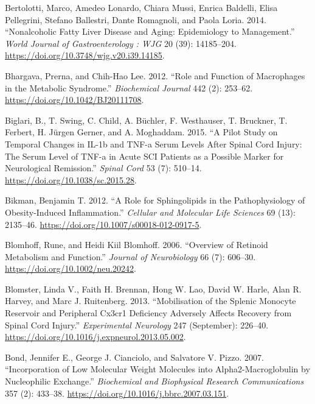 \documentclass[9pt,lineno]{elife}
\newlength{\cslhangindent}
\newlength{\cslentryspacingunit} %
\newenvironment{CSLReferences}[2] %
 {%
  \setlength{\parindent}{0pt}
  \ifodd #1
  \let\oldpar\par
  \def\par{\hangindent=\cslhangindent\oldpar}
  \fi
  \setlength{\parskip}{#2\cslentryspacingunit}
 }%
 {}
\begin{document}
\begin{CSLReferences}{1}{0}
\leavevmode{}%
Bertolotti, Marco, Amedeo Lonardo, Chiara Mussi, Enrica Baldelli, Elisa Pellegrini, Stefano Ballestri, Dante Romagnoli, and Paola Loria. 2014. {``Nonalcoholic Fatty Liver Disease and Aging: {Epidemiology} to Management.''} \emph{World Journal of Gastroenterology : WJG} 20 (39): 14185--204. \url{https://doi.org/10.3748/wjg.v20.i39.14185}.

\leavevmode{}%
Bhargava, Prerna, and Chih-Hao Lee. 2012. {``Role and Function of Macrophages in the Metabolic Syndrome.''} \emph{Biochemical Journal} 442 (2): 253--62. \url{https://doi.org/10.1042/BJ20111708}.

\leavevmode{}%
Biglari, B., T. Swing, C. Child, A. Büchler, F. Westhauser, T. Bruckner, T. Ferbert, H. Jürgen Gerner, and A. Moghaddam. 2015. {``A Pilot Study on Temporal Changes in {IL-1b} and {TNF-a} Serum Levels After Spinal Cord Injury: The Serum Level of {TNF-a} in Acute {SCI} Patients as a Possible Marker for Neurological Remission.''} \emph{Spinal Cord} 53 (7): 510--14. \url{https://doi.org/10.1038/sc.2015.28}.

\leavevmode{}%
Bikman, Benjamin T. 2012. {``A Role for Sphingolipids in the Pathophysiology of Obesity-Induced Inflammation.''} \emph{Cellular and Molecular Life Sciences} 69 (13): 2135--46. \url{https://doi.org/10.1007/s00018-012-0917-5}.

\leavevmode{}%
Blomhoff, Rune, and Heidi Kiil Blomhoff. 2006. {``Overview of Retinoid Metabolism and Function.''} \emph{Journal of Neurobiology} 66 (7): 606--30. \url{https://doi.org/10.1002/neu.20242}.

\leavevmode{}%
Blomster, Linda V., Faith H. Brennan, Hong W. Lao, David W. Harle, Alan R. Harvey, and Marc J. Ruitenberg. 2013. {``Mobilisation of the Splenic Monocyte Reservoir and Peripheral {Cx3cr1} Deficiency Adversely Affects Recovery from Spinal Cord Injury.''} \emph{Experimental Neurology} 247 (September): 226--40. \url{https://doi.org/10.1016/j.expneurol.2013.05.002}.

\leavevmode{}%
Bond, Jennifer E., George J. Cianciolo, and Salvatore V. Pizzo. 2007. {``Incorporation of Low Molecular Weight Molecules into Alpha2-{Macroglobulin} by Nucleophilic Exchange.''} \emph{Biochemical and Biophysical Research Communications} 357 (2): 433--38. \url{https://doi.org/10.1016/j.bbrc.2007.03.151}.


\end{CSLReferences}
\end{document}
